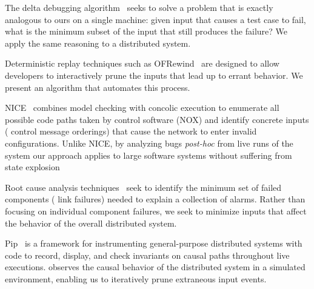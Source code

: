 
The delta debugging algorithm~\cite{Zeller:2002:SIF:506201.506206} seeks to solve
a problem that is exactly analogous to ours on a single machine: given input that causes a test case
to fail, what is the minimum subset of the input that still produces the failure?
We apply the same reasoning to a distributed system.


Deterministic replay techniques such as OFRewind~\cite{ofrewind}
are designed to allow developers to interactively prune
the inputs that lead up to errant behavior. We present an algorithm that
automates this process.


NICE~\cite{nice} combines model checking with concolic execution
to enumerate all possible code paths taken by control software (NOX)
and identify concrete inputs (\eg{} control message orderings) that cause
the network to enter invalid configurations. Unlike NICE, by analyzing
bugs {\em post-hoc} from live runs of the system our approach applies
to large software systems without suffering from state explosion 




Root cause analysis techniques~\cite{577079} seek to identify the minimum set of failed
components (\eg{} link failures) needed to explain a collection of alarms. Rather than
focusing on individual component failures, we seek to minimize inputs that affect the behavior
of the overall distributed system.


Pip~\cite{pip} is a framework for instrumenting general-purpose distributed systems
with code to record, display, and check invariants on causal paths throughout
live executions. \Simulator{} observes the causal behavior of the
distributed system in a simulated environment, enabling us to iteratively prune extraneous input events.

%

